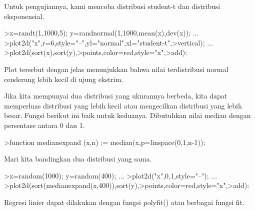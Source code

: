 \documentclass{article}
\begin{document}
\begin{eulernotebook}
\begin{eulercomment}
\begin{eulercomment}
\begin{eulercomment}
Untuk pengujiannya, kami mencoba distribusi student-t dan distribusi
eksponensial.
\end{eulercomment}
\begin{eulerprompt}
>x=randt(1,1000,5); y=randnormal(1,1000,mean(x),dev(x)); ...
>plot2d("x",r=6,style="--",yl="normal",xl="student-t",>vertical); ...
>plot2d(sort(x),sort(y),>points,color=red,style="x",>add):
\end{eulerprompt}
\begin{eulercomment}
Plot tersebut dengan jelas menunjukkan bahwa nilai terdistribusi
normal cenderung lebih kecil di ujung ekstrim.

Jika kita mempunyai dua distribusi yang ukurannya berbeda, kita dapat
memperluas distribusi yang lebih kecil atau mengecilkan distribusi
yang lebih besar. Fungsi berikut ini baik untuk keduanya. Dibutuhkan
nilai median dengan persentase antara 0 dan 1.
\end{eulercomment}
\begin{eulerprompt}
>function medianexpand (x,n) := median(x,p=linspace(0,1,n-1));
\end{eulerprompt}
\begin{eulercomment}
Mari kita bandingkan dua distribusi yang sama.
\end{eulercomment}
\begin{eulerprompt}
>x=random(1000); y=random(400); ...
>plot2d("x",0,1,style="--"); ...
>plot2d(sort(medianexpand(x,400)),sort(y),>points,color=red,style="x",>add):
\end{eulerprompt}
\begin{eulercomment}
Regresi linier dapat dilakukan dengan fungsi polyfit() atau berbagai
fungsi fit.


\end{eulercomment}
\end{eulercomment}
\end{eulercomment}
\end{eulernotebook}
\end{document}
